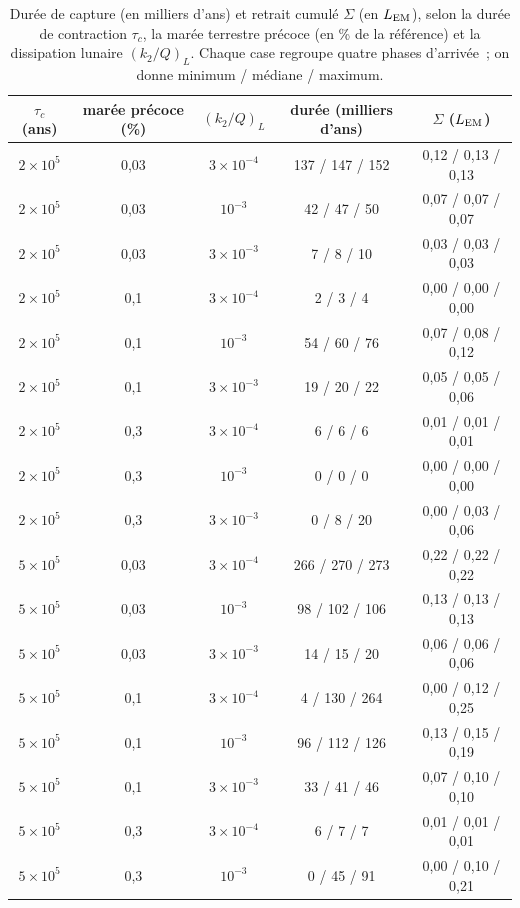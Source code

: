 \documentclass[11pt,a4paper]{article}
\newcommand{\LEM}{\ensuremath{L_{\rm EM}}}
\begin{document}
\begin{table}[htbp]
\centering\footnotesize\setlength{\tabcolsep}{5pt}
\caption{Durée de capture (en milliers d'ans) et retrait cumulé $\Sigma$ (en $\LEM$), selon la durée de contraction $\tau_c$, la marée terrestre précoce (en \% de la référence) et la dissipation lunaire $(k_2/Q)_L$. Chaque case regroupe quatre phases d'arrivée~; on donne minimum / médiane / maximum.\label{tab:duree}}
\begin{tabular}{ccccc}\toprule
$\tau_c$ (ans) & marée précoce (\%) & $(k_2/Q)_L$ & durée (milliers d'ans) & $\Sigma$ ($\LEM$) \\\midrule
$2\times10^5$ & 0,03 & $3\times10^{-4}$ & 137 / 147 / 152 & 0,12 / 0,13 / 0,13\\
$2\times10^5$ & 0,03 & $10^{-3}$ & 42 / 47 / 50 & 0,07 / 0,07 / 0,07\\
$2\times10^5$ & 0,03 & $3\times10^{-3}$ & 7 / 8 / 10 & 0,03 / 0,03 / 0,03\\
$2\times10^5$ & 0,1 & $3\times10^{-4}$ & 2 / 3 / 4 & 0,00 / 0,00 / 0,00\\
$2\times10^5$ & 0,1 & $10^{-3}$ & 54 / 60 / 76 & 0,07 / 0,08 / 0,12\\
$2\times10^5$ & 0,1 & $3\times10^{-3}$ & 19 / 20 / 22 & 0,05 / 0,05 / 0,06\\
$2\times10^5$ & 0,3 & $3\times10^{-4}$ & 6 / 6 / 6 & 0,01 / 0,01 / 0,01\\
$2\times10^5$ & 0,3 & $10^{-3}$ & 0 / 0 / 0 & 0,00 / 0,00 / 0,00\\
$2\times10^5$ & 0,3 & $3\times10^{-3}$ & 0 / 8 / 20 & 0,00 / 0,03 / 0,06\\
\midrule
$5\times10^5$ & 0,03 & $3\times10^{-4}$ & 266 / 270 / 273 & 0,22 / 0,22 / 0,22\\
$5\times10^5$ & 0,03 & $10^{-3}$ & 98 / 102 / 106 & 0,13 / 0,13 / 0,13\\
$5\times10^5$ & 0,03 & $3\times10^{-3}$ & 14 / 15 / 20 & 0,06 / 0,06 / 0,06\\
$5\times10^5$ & 0,1 & $3\times10^{-4}$ & 4 / 130 / 264 & 0,00 / 0,12 / 0,25\\
$5\times10^5$ & 0,1 & $10^{-3}$ & 96 / 112 / 126 & 0,13 / 0,15 / 0,19\\
$5\times10^5$ & 0,1 & $3\times10^{-3}$ & 33 / 41 / 46 & 0,07 / 0,10 / 0,10\\
$5\times10^5$ & 0,3 & $3\times10^{-4}$ & 6 / 7 / 7 & 0,01 / 0,01 / 0,01\\
$5\times10^5$ & 0,3 & $10^{-3}$ & 0 / 45 / 91 & 0,00 / 0,10 / 0,21\\

\end{tabular}
\end{table}
\end{document}
